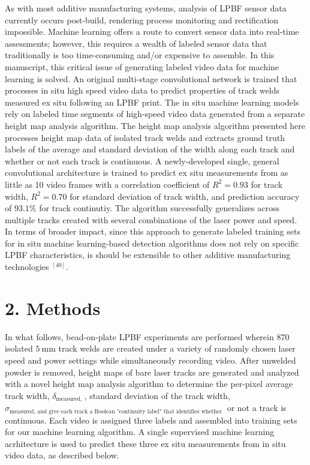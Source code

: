 \documentclass[10pt]{article}
\begin{document}
As with most additive manufacturing systems, analysis of LPBF sensor data currently occurs post-build, rendering process monitoring and rectification impossible. Machine learning offers a route to convert sensor data into real-time assessments; however, this requires a wealth of labeled sensor data that traditionally is too time-consuming and/or expensive to assemble. In this manuscript, this critical issue of generating labeled video data for machine learning is solved. An original multi-stage convolutional network is trained that processes in situ high speed video data to predict properties of track welds measured ex situ following an LPBF print. The in situ machine learning models rely on labeled time segments of high-speed video data generated from a separate height map analysis algorithm. The height map analysis algorithm presented here processes height map data of isolated track welds and extracts ground truth labels of the average and standard deviation of the width along each track and whether or not each track is continuous. A newly-developed single, general convolutional architecture is trained to predict ex situ measurements from as little as 10 video frames with a correlation coefficient of $R^{2}=0.93$ for track width, $R^{2}=0.70$ for standard deviation of track width, and prediction accuracy of $93.1 \%$ for track continutiy. The algorithm successfully generalizes across multiple tracks created with several combinations of the laser power and speed. In terms of broader impact, since this approach to generate labeled training sets for in situ machine learning-based detection algorithms does not rely on specific LPBF characteristics, is should be extensible to other additive manufacturing technologies ${ }^{[40]}$.

\section*{2. Methods}
In what follows, bead-on-plate LPBF experiments are performed wherein 870 isolated $5 \mathrm{~mm}$ track welds are created under a variety of randomly chosen laser speed and power settings while simultaneously recording video. After unwelded powder is removed, height maps of bare laser tracks are generated and analyzed with a novel height map analysis algorithm to determine the per-pixel average track width, $\delta_{\text {measured, }}$, standard deviation of the track width, $\sigma_{\text {measured, and give each track a Boolean "continuity label" that identifies whether }}$ or not a track is continuous. Each video is assigned three labels and assembled into training sets for our machine learning algorithm. A single supervised machine learning acrhitecture is used to predict these three ex situ measurements from in situ video data, as described below.
\end{document}
